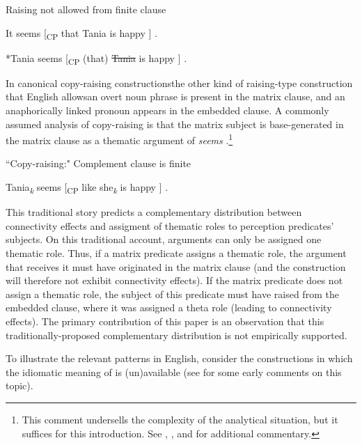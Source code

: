 \documentclass[output=paper,colorlinks,citecolor=brown
]{langscibook}
\begin{document}
\ea \label{ex:johnson:EnglishBadHr}

{{Raising not allowed from finite clause}}

\begin{xlist}

\ex \label{ex:johnson:EnglishBadHrA}

It seems [\textsubscript{CP} that Tania is happy ] .

\ex \label{ex:johnson:EnglishBadHrB}
*Tania seems [\textsubscript{CP} (that) \sout{Tania} is happy ] .

\end{xlist}
\z 

In canonical copy-raising constructions\textemdash the other kind of raising-type construction that English allows\textemdash an overt noun phrase is present in the matrix clause, and an anaphorically linked pronoun appears in the embedded clause. A commonly assumed analysis of copy-raising is that the matrix subject is base-generated in the matrix clause as a thematic argument of \textit{seems} \citep{PotsdamRunner:2001:CopyRaising}.\footnote{This comment undersells the complexity of the analytical situation, but it suffices for this introduction. See \citet{Landau:2009:CopyRaising,Landau:2011:CopyRaising}, \citet{AsudehToivonen2012CopyRaising}, and \citet{DenDikken:2017:HyperRaising} for additional commentary.}

\ea\label{ex:johnson:EnglishCopyRaising}
{{``Copy-raising:" Complement clause is finite}}

Tania\textsubscript{\textit{k}} seems [\textsubscript{CP} like she\textsubscript{\textit{k}} is happy ] .

\z 

\noindent This traditional story predicts a complementary distribution between connectivity effects and assigment of thematic roles to perception predicates' subjects. On this traditional account, arguments can only be assigned one thematic role. Thus, if a matrix predicate assigns a thematic role, the argument that receives it must have originated in the matrix clause (and the construction will therefore not exhibit connectivity effects). If the matrix predicate does not assign a thematic role, the subject of this predicate must have raised from the embedded clause, where it was assigned a theta role (leading to connectivity effects). The primary contribution of this paper is an observation that this traditionally-proposed complementary distribution is not empirically supported. 

To illustrate the relevant patterns in English, consider the constructions in which the idiomatic meaning of  is (un)available (see \citealt{PotsdamRunner:2001:CopyRaising} for some early comments on this topic). 
\end{document}
